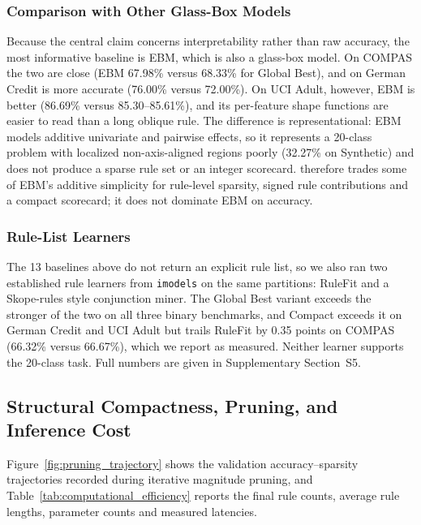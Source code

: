 \subsubsection{Comparison with Other Glass-Box Models}
Because the central claim concerns interpretability rather than raw accuracy,
the most informative baseline is EBM, which is also a glass-box model. On COMPAS
the two are close (EBM 67.98\% versus 68.33\% for Global Best), and on German
Credit \modelname{} is more accurate (76.00\% versus 72.00\%). On UCI Adult,
however, EBM is better (86.69\% versus 85.30--85.61\%), and its per-feature shape
functions are easier to read than a long oblique rule. The difference is
representational: EBM models additive univariate and pairwise effects, so it
represents a 20-class problem with localized non-axis-aligned regions poorly
(32.27\% on Synthetic) and does not produce a sparse rule set or an integer
scorecard. \modelname{} therefore trades some of EBM's additive simplicity for
rule-level sparsity, signed rule contributions and a compact scorecard; it does
not dominate EBM on accuracy.

\subsubsection{Rule-List Learners}
The 13 baselines above do not return an explicit rule list, so we also ran two
established rule learners from \texttt{imodels} on the same partitions: RuleFit
and a Skope-rules style conjunction miner. The Global Best variant exceeds the
stronger of the two on all three binary benchmarks, and Compact exceeds it on
German Credit and UCI Adult but trails RuleFit by 0.35 points on COMPAS
(66.32\% versus 66.67\%), which we report as measured. Neither learner supports
the 20-class task. Full numbers are given in Supplementary Section~S5.

\subsection{Structural Compactness, Pruning, and Inference Cost}
\label{subsec:pruning_trajectories}

Figure~\ref{fig:pruning_trajectory} shows the validation accuracy--sparsity
trajectories recorded during iterative magnitude pruning, and
Table~\ref{tab:computational_efficiency} reports the final rule counts, average
rule lengths, parameter counts and measured latencies.



